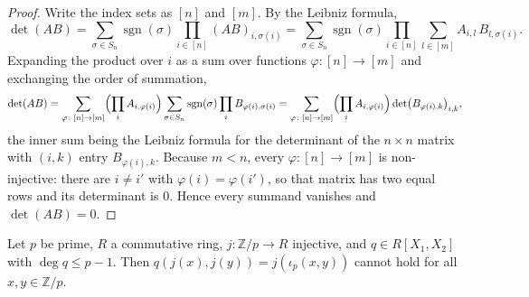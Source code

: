 \begin{proof}\leanok
Write the index sets as $[n]$ and $[m]$. By the Leibniz formula,
\[
  \det(AB) = \sum_{\sigma \in S_n} \operatorname{sgn}(\sigma) \prod_{i \in [n]} (AB)_{i,\sigma(i)}
           = \sum_{\sigma \in S_n} \operatorname{sgn}(\sigma) \prod_{i \in [n]}
             \sum_{l \in [m]} A_{i,l}\, B_{l,\sigma(i)} .
\]
Expanding the product over $i$ as a sum over functions $\varphi \colon [n] \to [m]$ and
exchanging the order of summation,
\[
  \det(AB) = \sum_{\varphi \colon [n] \to [m]} \Bigl(\prod_{i} A_{i,\varphi(i)}\Bigr)
             \sum_{\sigma \in S_n} \operatorname{sgn}(\sigma) \prod_{i} B_{\varphi(i),\sigma(i)}
           = \sum_{\varphi \colon [n] \to [m]} \Bigl(\prod_{i} A_{i,\varphi(i)}\Bigr)
             \det\bigl(B_{\varphi(i),k}\bigr)_{i,k},
\]
the inner sum being the Leibniz formula for the determinant of the $n \times n$ matrix with
$(i,k)$ entry $B_{\varphi(i),k}$. Because $m < n$, every $\varphi \colon [n] \to [m]$ is
non-injective: there are $i \ne i'$ with $\varphi(i) = \varphi(i')$, so that matrix has two
equal rows and its determinant is $0$. Hence every summand vanishes and $\det(AB) = 0$.
\end{proof}

\begin{theorem}\label{thm:invp}
\leanok{}
Let $p$ be prime, $R$ a commutative ring, $j \colon \mathbb{Z}/p \to R$ injective, and
$q \in R[X_1,X_2]$ with $\deg q \le p-1$. Then $q(j(x), j(y)) = j(\iota_p(x,y))$ cannot
hold for all $x, y \in \mathbb{Z}/p$.
\end{theorem}

